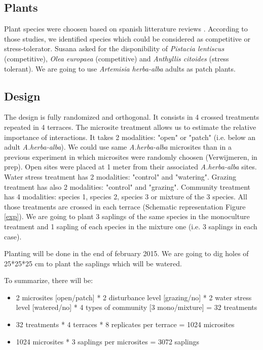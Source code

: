 \documentclass[12pt]{article} %
\begin{document}
\subsection{Plants}
Plant species were choosen based on spanish litterature reviews \citep{McCluney2012,Navarro2006, Jauffret2003}. According to those studies, we identified species which could be considered as competitive or stress-tolerator. Susana asked for the disponibility of \textit{Pistacia lentiscus} (competitive), \textit{Olea europaea} (competitive) and \textit{Anthyllis citoides} (stress tolerant). We are going to use \textit{Artemisia herba-alba} adults as patch plants.

\subsection{Design}
The design is fully randomized and orthogonal. It consists in 4 crossed treatments repeated in 4 terraces. The microsite treatment allows us to estimate the relative importance of interactions. It takes 2 modalities: "open" or "patch" (i.e. below an adult \textit{A.herba-alba}). We could use same \textit{A.herba-alba} microsites than in a previous experiment in which microsites were randomly choosen (Verwijmeren, in prep). Open sites were placed at 1 meter from their associated \textit{A.herba-alba} sites. Water stress treatment has 2 modalities: "control" and "watering". Grazing treatment has also 2 modalities: "control" and "grazing". Community treatment has 4 modalities: species 1, species 2, species 3 or mixture of the 3 species. All those treatments are crossed in each terrace (Schematic representation Figure \ref{exp}). We are going to plant 3 saplings of the same species in the monoculture treatment and 1 sapling of each species in the mixture one (i.e. 3 saplings in each case).

Planting will be done in the end of february 2015. We are going to dig holes of 25*25*25 cm to plant the saplings which will be watered.

To summarize, there will be:
\begin{itemize} %
\item 2 microsites [open/patch] * 2 disturbance level [grazing/no] * 2 water stress level [watered/no] * 4 types of community [3 mono/mixture] = 32 treatments
\item 32 treatments * 4 terraces * 8 replicates per terrace = 1024 microsites
\item 1024 microsites * 3 saplings per microsites = 3072 saplings 
\end{itemize}
\end{document}
